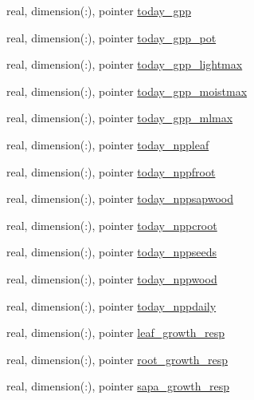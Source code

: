 \begin{DoxyCompactItemize}
\item 
real, dimension(\+:), pointer \hyperlink{structed__state__vars_1_1patchtype_a2b2b67d24287d39e58e5e6738feb5529}{today\+\_\+gpp}
\item 
real, dimension(\+:), pointer \hyperlink{structed__state__vars_1_1patchtype_ab897cae678aaacb76dea19509f306833}{today\+\_\+gpp\+\_\+pot}
\item 
real, dimension(\+:), pointer \hyperlink{structed__state__vars_1_1patchtype_a4c21b1a42ceb17284cfa4b4e966fb765}{today\+\_\+gpp\+\_\+lightmax}
\item 
real, dimension(\+:), pointer \hyperlink{structed__state__vars_1_1patchtype_a2ab99f78623861fe5516e797eaf044bc}{today\+\_\+gpp\+\_\+moistmax}
\item 
real, dimension(\+:), pointer \hyperlink{structed__state__vars_1_1patchtype_a0c2616ae9f2d9477cc967b724aa957f6}{today\+\_\+gpp\+\_\+mlmax}
\item 
real, dimension(\+:), pointer \hyperlink{structed__state__vars_1_1patchtype_a810608b2b51f2ff2a1601ead979bbcc3}{today\+\_\+nppleaf}
\item 
real, dimension(\+:), pointer \hyperlink{structed__state__vars_1_1patchtype_ad865933312bdec1d5fb159f74ce7462e}{today\+\_\+nppfroot}
\item 
real, dimension(\+:), pointer \hyperlink{structed__state__vars_1_1patchtype_a52cbd63c99fc53277d009709628132d3}{today\+\_\+nppsapwood}
\item 
real, dimension(\+:), pointer \hyperlink{structed__state__vars_1_1patchtype_ab5304e8e5df67b4d7f9eebc35d64a74e}{today\+\_\+nppcroot}
\item 
real, dimension(\+:), pointer \hyperlink{structed__state__vars_1_1patchtype_ab480bfcb50eb0de886162116d0ae238e}{today\+\_\+nppseeds}
\item 
real, dimension(\+:), pointer \hyperlink{structed__state__vars_1_1patchtype_a31540df8cc481ed6ccb8feb9d681a188}{today\+\_\+nppwood}
\item 
real, dimension(\+:), pointer \hyperlink{structed__state__vars_1_1patchtype_a4dc9882c7fd207d58cc8bb3064c4ffae}{today\+\_\+nppdaily}
\item 
real, dimension(\+:), pointer \hyperlink{structed__state__vars_1_1patchtype_a39ea30b7e1221c92ddc7c2e9eed61a02}{leaf\+\_\+growth\+\_\+resp}
\item 
real, dimension(\+:), pointer \hyperlink{structed__state__vars_1_1patchtype_ad505fc22ad6715a722b7dece94c8200e}{root\+\_\+growth\+\_\+resp}
\item 
real, dimension(\+:), pointer \hyperlink{structed__state__vars_1_1patchtype_a6802528cee0ab486be33c54c8ac389d6}{sapa\+\_\+growth\+\_\+resp}

\end{DoxyCompactItemize}
